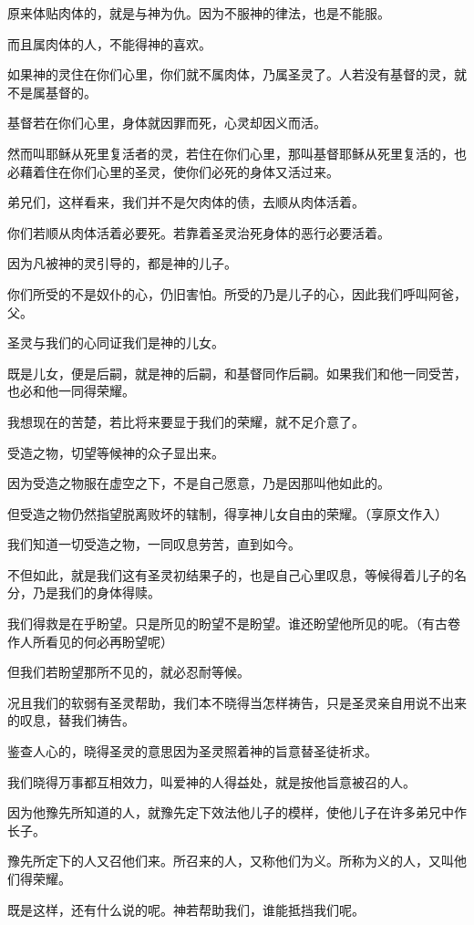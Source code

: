 \documentclass[12pt,oneside]{book}
\begin{document}
原来体贴肉体的，就是与神为仇。因为不服神的律法，也是不能服。

而且属肉体的人，不能得神的喜欢。

如果神的灵住在你们心里，你们就不属肉体，乃属圣灵了。人若没有基督的灵，就不是属基督的。

基督若在你们心里，身体就因罪而死，心灵却因义而活。

然而叫耶稣从死里复活者的灵，若住在你们心里，那叫基督耶稣从死里复活的，也必藉着住在你们心里的圣灵，使你们必死的身体又活过来。

弟兄们，这样看来，我们并不是欠肉体的债，去顺从肉体活着。

你们若顺从肉体活着必要死。若靠着圣灵治死身体的恶行必要活着。

因为凡被神的灵引导的，都是神的儿子。

你们所受的不是奴仆的心，仍旧害怕。所受的乃是儿子的心，因此我们呼叫阿爸，父。

圣灵与我们的心同证我们是神的儿女。

既是儿女，便是后嗣，就是神的后嗣，和基督同作后嗣。如果我们和他一同受苦，也必和他一同得荣耀。

我想现在的苦楚，若比将来要显于我们的荣耀，就不足介意了。

受造之物，切望等候神的众子显出来。

因为受造之物服在虚空之下，不是自己愿意，乃是因那叫他如此的。

但受造之物仍然指望脱离败坏的辖制，得享神儿女自由的荣耀。（享原文作入）

我们知道一切受造之物，一同叹息劳苦，直到如今。

不但如此，就是我们这有圣灵初结果子的，也是自己心里叹息，等候得着儿子的名分，乃是我们的身体得赎。

我们得救是在乎盼望。只是所见的盼望不是盼望。谁还盼望他所见的呢。（有古卷作人所看见的何必再盼望呢）

但我们若盼望那所不见的，就必忍耐等候。

况且我们的软弱有圣灵帮助，我们本不晓得当怎样祷告，只是圣灵亲自用说不出来的叹息，替我们祷告。

鉴查人心的，晓得圣灵的意思因为圣灵照着神的旨意替圣徒祈求。

我们晓得万事都互相效力，叫爱神的人得益处，就是按他旨意被召的人。

因为他豫先所知道的人，就豫先定下效法他儿子的模样，使他儿子在许多弟兄中作长子。

豫先所定下的人又召他们来。所召来的人，又称他们为义。所称为义的人，又叫他们得荣耀。

既是这样，还有什么说的呢。神若帮助我们，谁能抵挡我们呢。
\end{document}
